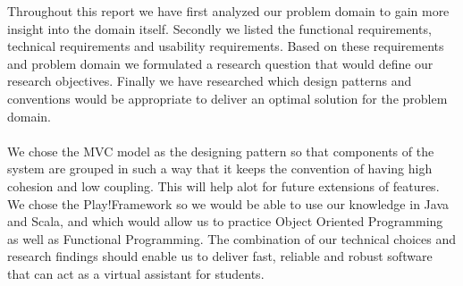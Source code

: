 Throughout this report we have first analyzed our problem domain to gain more insight into the domain itself. Secondly we listed the functional requirements, technical requirements and usability requirements. Based on these requirements and problem domain we formulated a research question that would define our research objectives. Finally we have researched which design patterns and conventions would be appropriate to deliver an optimal solution for the problem domain.\\\\
We chose the MVC model as the designing pattern so that components of the system are grouped in such a way that it keeps the convention of having high cohesion and low coupling. This will help alot for future extensions of features. We chose the Play!Framework so we would be able to use our knowledge in Java and Scala, and which would allow us to practice Object Oriented Programming as well as Functional Programming. The combination of our technical choices and research findings should enable us to deliver fast, reliable and robust software that can act as a virtual assistant for students.

